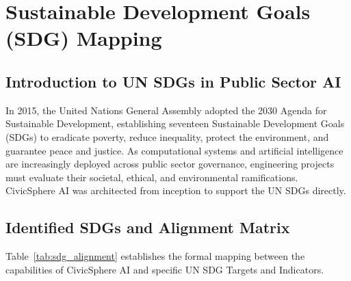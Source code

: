 \chapter{Sustainable Development Goals (SDG) Mapping}
\label{ch:sdg_mapping}

\section{Introduction to UN SDGs in Public Sector AI}
\label{sec:sdg_intro}
In 2015, the United Nations General Assembly adopted the 2030 Agenda for Sustainable Development, establishing seventeen Sustainable Development Goals (SDGs) to eradicate poverty, reduce inequality, protect the environment, and guarantee peace and justice. As computational systems and artificial intelligence are increasingly deployed across public sector governance, engineering projects must evaluate their societal, ethical, and environmental ramifications. CivicSphere AI was architected from inception to support the UN SDGs directly.

\section{Identified SDGs and Alignment Matrix}
\label{sec:sdg_matrix}
Table~\ref{tab:sdg_alignment} establishes the formal mapping between the capabilities of CivicSphere AI and specific UN SDG Targets and Indicators.

